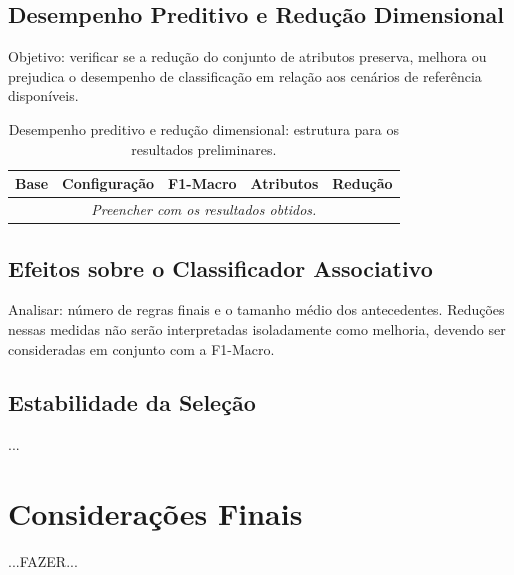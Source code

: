 \subsection{Desempenho Preditivo e Redução Dimensional}\label{subsec:exp-resultados-f1-reducao}

Objetivo: verificar se a redução do conjunto de
atributos preserva, melhora ou prejudica o desempenho de classificação em
relação aos cenários de referência disponíveis.

\begin{table}[htbp]
    \centering
    \small
    \caption{Desempenho preditivo e redução dimensional: estrutura para os resultados preliminares.}
    \label{tab:exp-resultados-principais}
    \begin{tabular}{p{2.5cm}p{3.0cm}p{2.7cm}p{2.1cm}p{2.1cm}}
        \hline
        \textbf{Base} & \textbf{Configuração} &
        \textbf{F1-Macro} & \textbf{Atributos} & \textbf{Redução} \\
        \hline
        \multicolumn{5}{c}{\textit{Preencher com os resultados obtidos.}} \\
        \hline
    \end{tabular}
\end{table}

\subsection{Efeitos sobre o Classificador Associativo}
\label{subsec:exp-resultados-regras}

Analisar: número de regras finais e o tamanho médio dos antecedentes. Reduções nessas medidas não serão interpretadas isoladamente como
melhoria, devendo ser consideradas em conjunto com a F1-Macro.

\subsection{Estabilidade da Seleção}\label{subsec:exp-resultados-estabilidade}
...



\section{Considerações Finais}\label{sec:exp-consideracoes}

...FAZER...
